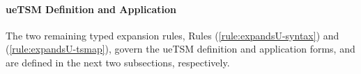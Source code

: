 \paragraph{ueTSM Definition and Application} The two remaining typed expansion rules, Rules (\ref{rule:expandsU-syntax}) and (\ref{rule:expandsU-tsmap}), govern the ueTSM definition and application forms, and are defined in the next two subsections, respectively. 



